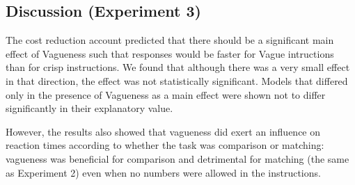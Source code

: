 \subsection{Discussion (Experiment 3)}

The cost reduction account predicted that there should be a significant main effect of Vagueness such that responses would be faster for Vague intructions than for crisp instructions. We found that although there was a very small effect in that direction, the effect was not statistically significant. Models that differed only in the presence of Vagueness as a main effect were shown not to differ significantly in their explanatory value. 

However, the results also showed that vagueness did exert an influence on reaction times according to whether the task was comparison or matching: vagueness was beneficial for comparison and detrimental for matching (the same as Experiment 2) even when no numbers were allowed in the instructions. 

